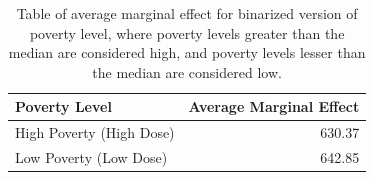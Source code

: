 \begin{table}[ht]
\centering
\caption{Table of average marginal effect for binarized version 
             of poverty level, where poverty levels greater than the median are 
             considered high, and poverty levels lesser than the median 
             are considered low.} 
\label{tab:ett}
\begin{tabular}{lr}
  \hline
Poverty Level & Average Marginal Effect \\ 
  \hline
High Poverty (High Dose) & 630.37 \\ 
  Low Poverty (Low Dose) & 642.85 \\ 
   \hline
\end{tabular}
\end{table}
